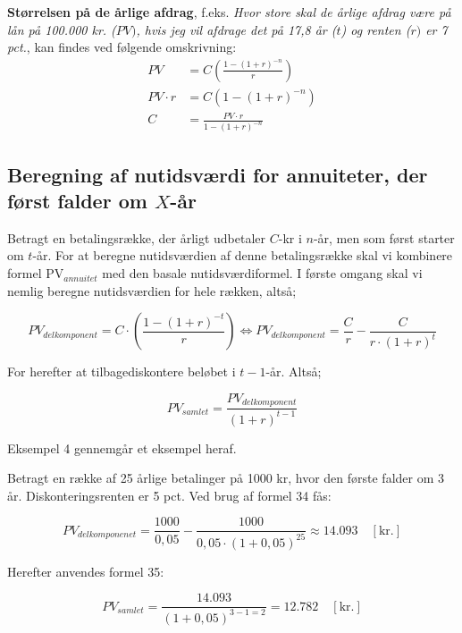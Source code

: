 \documentclass[10pt,reqno, usenames]{article}
\begin{document}
\textbf{Størrelsen på de årlige afdrag}, f.eks. \textit{Hvor store skal de årlige afdrag være på lån på 100.000 kr. ($PV)$, hvis jeg vil afdrage det på 17,8 år ($t$) og renten ($r)$ er 7 pct.}, kan findes ved følgende omskrivning: 
\begin{align}
PV &= C \left( \frac{1 - (1 + r)^{-n}}{r} \right) \nonumber \\
PV \cdot r &= C \left( 1 - (1 + r)^{-n} \right) \nonumber\\
C &= \frac{PV \cdot r}{1 - (1 + r)^{-n}}
\end{align}


\subsection{Beregning af nutidsværdi for annuiteter, der først falder om $X$-år}
Betragt en betalingsrække, der årligt udbetaler $C$-kr i $n$-år, men som først starter om $t$-år. For at beregne nutidsværdien af denne betalingsrække skal vi kombinere formel PV$_{annuitet}$ med den basale nutidsværdiformel. I første omgang skal vi nemlig beregne nutidsværdien for hele rækken, altså; 

\begin{equation}
PV_{delkomponent} = C \cdot \left( \frac{1 - (1 + r)^{-t}}{r} \right) \Longleftrightarrow
    PV_{delkomponent} = \frac{C}{r} - \frac{C}{r \cdot (1+r)^t} 
\end{equation}

For herefter at tilbagediskontere beløbet i $t-1$-år. Altså; 

\begin{equation}
    PV_{samlet} = \frac{PV_{delkomponent}}{(1+r)^{t-1}}
\end{equation}

Eksempel 4 gennemgår et eksempel heraf. 

\begin{tcolorbox}[breakable, colback=red!5!white, colframe=red!50!black, title= Eksempel 3: Beregning af nutidsværdi for forskudte annuiteter]
Betragt en række af 25 årlige betalinger på 1000 kr, hvor den første falder om 3 år. Diskonteringsrenten er 5 pct. Ved brug af formel 34 fås: 

\begin{equation*}
    PV_{delkomponenet} = \frac{1000}{0,05} - \frac{1000}{0,05 \cdot (1+0,05)^25} \approx 14.093 \quad [\text{kr.}]
\end{equation*}

Herefter anvendes formel 35: 

\begin{equation*}
    PV_{samlet} = \frac{14.093}{(1+0,05)^{3-1=2}} = 12.782 \quad [\text{kr.}]
\end{equation*}
\end{tcolorbox}
\end{document}
